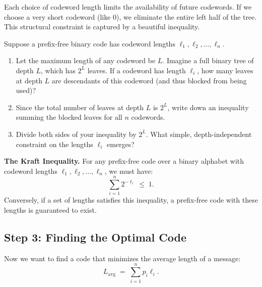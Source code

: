 Each choice of codeword length limits the availability of future codewords. If we choose a very short codeword (like $0$), we eliminate the entire left half of the tree. This structural constraint is captured by a beautiful inequality.

\begin{problem}
Suppose a prefix-free binary code has codeword lengths $\ell_1, \ell_2, \ldots, \ell_n$.
\begin{enumerate}[label=(\alph*), topsep=2pt]
  \item Let the maximum length of any codeword be $L$. Imagine a full binary tree of depth $L$, which has $2^L$ leaves. If a codeword has length $\ell_i$, how many leaves at depth $L$ are descendants of this codeword (and thus blocked from being used)?
  \item Since the total number of leaves at depth $L$ is $2^L$, write down an inequality summing the blocked leaves for all $n$ codewords.
  \item Divide both sides of your inequality by $2^L$. What simple, depth-independent constraint on the lengths $\ell_i$ emerges?
\end{enumerate}
\end{problem}

\begin{discoverybox}
\textbf{The Kraft Inequality.}
For any prefix-free code over a binary alphabet with codeword lengths $\ell_1, \ell_2, \ldots, \ell_n$, we must have:
\[
  \sum_{i=1}^{n} 2^{-\ell_i} \;\le\; 1.
\]
Conversely, if a set of lengths satisfies this inequality, a prefix-free code with these lengths is guaranteed to exist.
\end{discoverybox}

\subsection{Step 3: Finding the Optimal Code}

Now we want to find a code that minimizes the average length of a message:
\[
  L_{\text{avg}} \;=\; \sum_{i=1}^{n} p_i \ell_i.
\]

